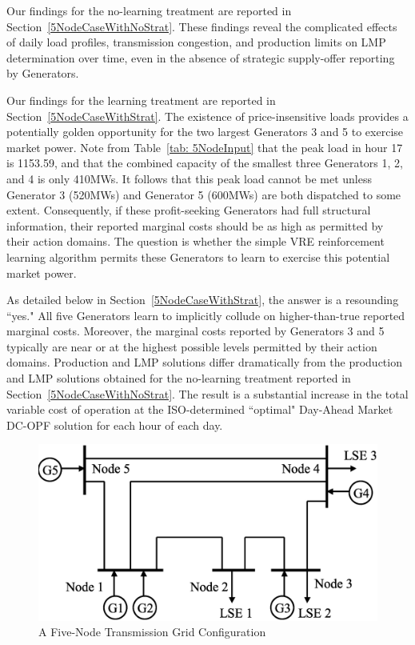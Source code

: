 \documentclass[12pt]{article}
\begin{document}
Our findings for the no-learning treatment are reported in Section~\ref{5NodeCaseWithNoStrat}. These findings reveal the complicated effects of daily load profiles, transmission congestion, and production limits on LMP determination over time, even in the absence of strategic supply-offer reporting by Generators.  

Our findings for the learning treatment are reported in Section~\ref{5NodeCaseWithStrat}. The existence of price-insensitive loads provides a potentially golden opportunity for the two largest Generators 3 and 5 to exercise market power.  Note from Table~\ref{tab: 5NodeInput} that the peak load in hour 17 is 1153.59, and that the combined capacity of the smallest three Generators 1, 2, and 4 is only 410MWs.  It follows that this peak load cannot be met unless Generator 3 (520MWs) and Generator 5 (600MWs) are both dispatched to some extent. Consequently, if these profit-seeking Generators had full structural information, their reported marginal costs should be as high as permitted by their action domains.  The question is whether the simple VRE reinforcement learning algorithm permits these Generators to learn to exercise this potential market power.

As detailed below in Section~\ref{5NodeCaseWithStrat}, the answer is a resounding ``yes."  All five Generators learn to implicitly collude on higher-than-true reported marginal costs.  Moreover, the marginal costs reported by Generators 3 and 5 typically are near or at the highest possible levels permitted by their action domains.   Production and LMP solutions differ dramatically from the production and LMP solutions obtained for the no-learning treatment reported in Section~\ref{5NodeCaseWithNoStrat}.  The result is a substantial increase in the total variable cost of operation at the ISO-determined ``optimal" Day-Ahead Market DC-OPF solution for each hour of each day.  

     
\begin{figure}
	\centering
		\includegraphics[totalheight = 8cm]{5Node.eps}
	\caption{A Five-Node Transmission Grid Configuration}
	\label{fig:5Node}
\end{figure}  
\end{document}
